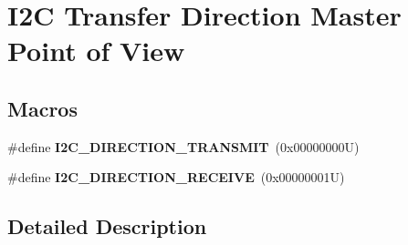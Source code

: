 \hypertarget{group___i2_c___x_f_e_r_d_i_r_e_c_t_i_o_n}{}\section{I2C Transfer Direction Master Point of View}
\label{group___i2_c___x_f_e_r_d_i_r_e_c_t_i_o_n}
\subsection*{Macros}
\begin{DoxyCompactItemize}
\item 
\mbox{\label{group___i2_c___x_f_e_r_d_i_r_e_c_t_i_o_n_ga4995d0291421b538d7859e998803c567}} 
\#define {\bfseries I2\+C\+\_\+\+D\+I\+R\+E\+C\+T\+I\+O\+N\+\_\+\+T\+R\+A\+N\+S\+M\+IT}~(0x00000000\+U)
\item 
\mbox{\label{group___i2_c___x_f_e_r_d_i_r_e_c_t_i_o_n_gacfbbd511a4f68bbd9965d0e5a192e261}} 
\#define {\bfseries I2\+C\+\_\+\+D\+I\+R\+E\+C\+T\+I\+O\+N\+\_\+\+R\+E\+C\+E\+I\+VE}~(0x00000001\+U)
\end{DoxyCompactItemize}


\subsection{Detailed Description}
